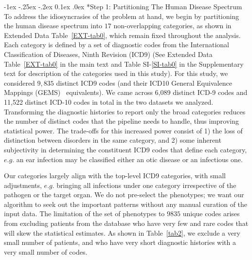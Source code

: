 \documentclass[onecolumn,,10pt]{IEEEtran}
\makeatletter
\renewcommand\subsection{\@startsection {section}{1}{\z@}%
  {-1ex \@plus -.25ex \@minus -.2ex}%
  {0.1ex \@plus.0ex}%
  {\fontsize{11}{12}\selectfont\bfseries\sffamily\color{DodgerBlue4}}}
\makeatother
\begin{document}
 
\subsection*{Step 1: Partitioning The Human Disease Spectrum} To address the idiosyncrasies of the problem at hand, we begin by partitioning the human disease spectrum into  $17$ non-overlapping  categories,  as shown in Extended Data Table~\ref{EXT-tab0}, which remain fixed throughout the analysis. Each category is defined by a set of diagnostic codes from the International Classification of Diseases, Ninth Revision (ICD9) (See Extended Data Table~\ref{EXT-tab0} in the main text  and Table SI-\ref{SI-tab0} in the Supplementary text for description of  the categories used in this study).
For this study, we considered $9,835$ distinct ICD9 codes (and their ICD10 General Equivalence Mappings (GEMS)~\cite{GEMS} equivalents). We came across 6,089 distinct ICD-9 codes and 11,522 distinct ICD-10 codes in total in the two datasets we analyzed. Transforming the diagnostic histories to report only the broad categories   reduces the number of distinct codes that the pipeline needs to handle, thus improving statistical  power.  The trade-offs for this increased power consist of 1) the loss of distinction between disorders in the same category, and  2) some inherent subjectivity in determining the constituent ICD9 codes that define each category, $e.g.$ an ear infection may be classified either an otic disease or an infectious one.

Our categories largely align with the top-level ICD9 categories, with small 
adjustments, $e.g.$ bringing all infections under one category irrespective of the pathogen or the target organ.
We do not pre-select the phenotypes; we want our algorithm to seek out the important patterns without any manual curation of the input data. The limitation of the set of phenotypes to $9835$ unique codes arises from excluding patients from the database who have very few and rare codes that will skew the statistical estimates. As shown in Table~\ref{tab2}, we exclude a very small number of patients, and who have  very short diagnostic histories with a very small number of codes.
\end{document}
